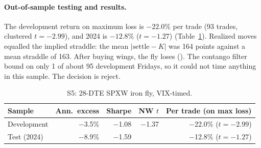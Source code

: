 \documentclass[../main.tex]{subfiles}
\begin{document}
\paragraph{Out-of-sample testing and results.}
The development return on maximum loss is $-22.0\%$ per trade (93 trades, clustered $t = -2.99$), and 2024 is $-12.8\%$ ($t = -1.27$) (Table~\ref{tab:s5}). Realized moves equalled the implied straddle: the mean $|\mathrm{settle} - K|$ was 164 points against a mean straddle of 163. After buying wings, the fly loses (). The contango filter bound on only 1 of about 95 development Fridays, so it could not time anything in this sample. The decision is reject.

\begin{table}[tbp]
\centering\small
\caption{S5: 28-DTE SPXW iron fly, VIX-timed.}\label{tab:s5}
\begin{tabular}{@{}lrrrr@{}}
\toprule
Sample & Ann.\ excess & Sharpe & NW $t$ & Per trade (on max loss) \\
\midrule
Development & $-$3.5\% & $-$1.08 & $-$1.37 & $-$22.0\% ($t=-2.99$) \\
Test (2024) & $-$8.9\% & $-$1.59 & & $-$12.8\% ($t=-1.27$) \\
\bottomrule
\end{tabular}
\end{table}

\end{document}
